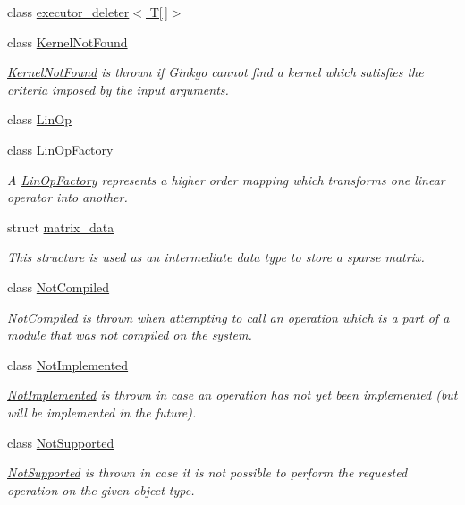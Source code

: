 \begin{DoxyCompactItemize}
class \hyperlink{classgko_1_1executor__deleter_3_01T[]_4}{executor\+\_\+deleter$<$ T\mbox{[}$\,$\mbox{]}$>$}
\item 
class \hyperlink{classgko_1_1KernelNotFound}{Kernel\+Not\+Found}
\begin{DoxyCompactList}\small\item\em \hyperlink{classgko_1_1KernelNotFound}{Kernel\+Not\+Found} is thrown if Ginkgo cannot find a kernel which satisfies the criteria imposed by the input arguments. \end{DoxyCompactList}\item 
class \hyperlink{classgko_1_1LinOp}{Lin\+Op}
\item 
class \hyperlink{classgko_1_1LinOpFactory}{Lin\+Op\+Factory}
\begin{DoxyCompactList}\small\item\em A \hyperlink{classgko_1_1LinOpFactory}{Lin\+Op\+Factory} represents a higher order mapping which transforms one linear operator into another. \end{DoxyCompactList}\item 
struct \hyperlink{structgko_1_1matrix__data}{matrix\+\_\+data}
\begin{DoxyCompactList}\small\item\em This structure is used as an intermediate data type to store a sparse matrix. \end{DoxyCompactList}\item 
class \hyperlink{classgko_1_1NotCompiled}{Not\+Compiled}
\begin{DoxyCompactList}\small\item\em \hyperlink{classgko_1_1NotCompiled}{Not\+Compiled} is thrown when attempting to call an operation which is a part of a module that was not compiled on the system. \end{DoxyCompactList}\item 
class \hyperlink{classgko_1_1NotImplemented}{Not\+Implemented}
\begin{DoxyCompactList}\small\item\em \hyperlink{classgko_1_1NotImplemented}{Not\+Implemented} is thrown in case an operation has not yet been implemented (but will be implemented in the future). \end{DoxyCompactList}\item 
class \hyperlink{classgko_1_1NotSupported}{Not\+Supported}
\begin{DoxyCompactList}\small\item\em \hyperlink{classgko_1_1NotSupported}{Not\+Supported} is thrown in case it is not possible to perform the requested operation on the given object type. \end{DoxyCompactList}\item 

\end{DoxyCompactItemize}
